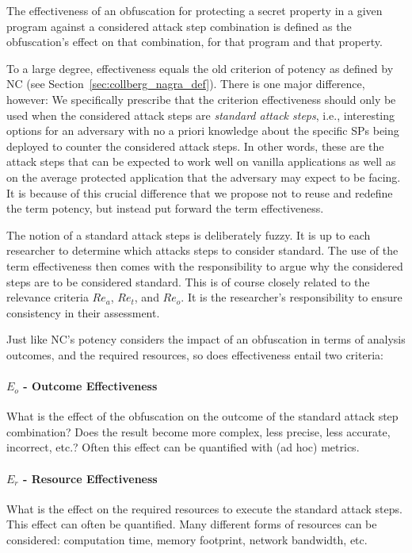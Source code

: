 The effectiveness of an obfuscation for protecting a secret property in a given program against a considered attack step combination is defined as the obfuscation's effect on that combination, for that program and that property. 

To a large degree, effectiveness equals the old criterion of potency as defined by NC (see Section~\ref{sec:collberg_nagra_def}). There is one major difference, however: We specifically prescribe that the criterion effectiveness should only be used when the considered attack steps are \emph{standard attack steps}, i.e., interesting options for an adversary with no a priori knowledge about the specific SPs being deployed to counter the considered attack steps. In other words, these are the attack steps that can be expected to work well on vanilla applications as well as on the average protected application that the adversary may expect to be facing.  It is because of this crucial difference that we propose not to reuse and redefine the term potency, but instead put forward the term effectiveness. 

The notion of a standard attack steps is deliberately fuzzy. It is up to each researcher to determine which attacks steps to consider standard. The use of the term effectiveness then comes with the responsibility  to argue why the considered steps are to be considered standard. This is of course closely related to the relevance criteria $Re_a$, $Re_t$, and $Re_o$. It is the researcher's responsibility to ensure consistency in their assessment. 

Just like NC's potency considers the impact of an obfuscation in terms of analysis outcomes, and the required resources, so does effectiveness entail two criteria:

\paragraph{$E_o$ - Outcome Effectiveness} What is the effect of the obfuscation on the outcome of the standard attack step combination? Does the result become more complex, less precise, less accurate, incorrect, etc.? Often this effect can be quantified with (ad hoc) metrics. 

\paragraph{$E_r$ - Resource Effectiveness} What is the effect on the required resources to execute the standard attack steps. This effect can often be quantified. Many different forms of resources can be considered: computation time, memory footprint, network bandwidth, etc.

